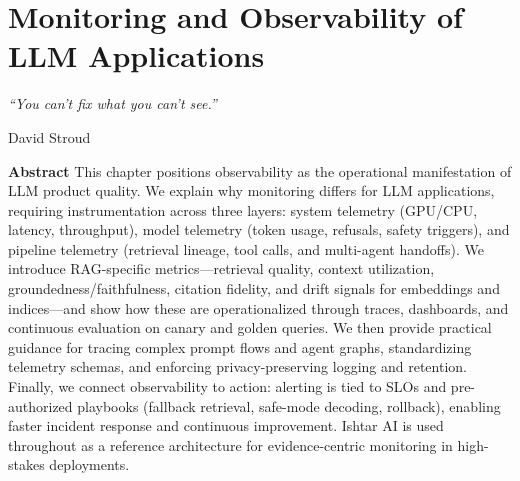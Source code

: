 \chapter{Monitoring and Observability of LLM Applications}
\label{ch:monitoring}
\newrefsegment


\epigraph{\emph{``You can't fix what you can't see.''}}{David Stroud}

\textbf{Abstract} This chapter positions observability as the operational manifestation of LLM product quality. We explain why monitoring differs for LLM applications, requiring instrumentation across three layers: system telemetry (GPU/CPU, latency, throughput), model telemetry (token usage, refusals, safety triggers), and pipeline telemetry (retrieval lineage, tool calls, and multi-agent handoffs). We introduce RAG-specific metrics—retrieval quality, context utilization, groundedness/faithfulness, citation fidelity, and drift signals for embeddings and indices—and show how these are operationalized through traces, dashboards, and continuous evaluation on canary and golden queries. We then provide practical guidance for tracing complex prompt flows and agent graphs, standardizing telemetry schemas, and enforcing privacy-preserving logging and retention. Finally, we connect observability to action: alerting is tied to SLOs and pre-authorized playbooks (fallback retrieval, safe-mode decoding, rollback), enabling faster incident response and continuous improvement. Ishtar AI is used throughout as a reference architecture for evidence-centric monitoring in high-stakes deployments.


